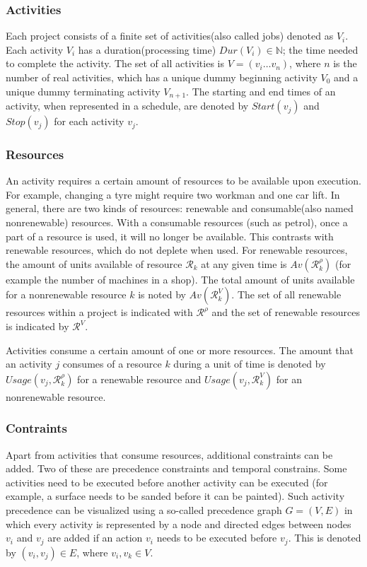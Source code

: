 \documentclass{article}
\begin{document}
\subsubsection{Activities}
Each project consists of a finite set of activities(also called jobs) denoted as $V_i$. Each activity $V_i$ has a duration(processing time) $Dur(V_i) \in \mathbb{N}$; the time needed to complete the activity. The set of all activities is $V = (v_i \ldots v_n)$, where $n$ is the number of real activities, which has a unique dummy beginning activity $V_0$ and a unique dummy terminating activity $V_{n+1}$. The starting and end times of an activity, when represented in a schedule, are denoted by $Start(v_j)$ and $Stop(v_j)$ for each activity $v_j$.

\subsubsection{Resources}
An activity requires a certain amount of resources to be available upon execution. For example, changing a tyre might require two workman and one car lift. In general, there are two kinds of resources: renewable and consumable(also named nonrenewable) resources. With a consumable resources (such as petrol), once a part of a resource is used, it will no longer be available. This contrasts with renewable resources, which do not deplete when used. For renewable resources, the amount of units available of resource $\mathcal{R}_k$ at any given time is $Av(\mathcal{R}^{\rho}_k)$ (for example the number of machines in a shop). The total amount of units available for a nonrenewable resource $k$ is noted by $Av(\mathcal{R}^{V}_k)$. The set of all renewable resources within a project is indicated with $\mathcal{R}^{\rho}$ and the set of renewable resources is indicated by $\mathcal{R}^{V}$. 

Activities consume a certain amount of one or more resources. The amount that an activity $j$ consumes of a resource $k$ during a unit of time is denoted by $Usage(v_j, \mathcal{R}^{\rho}_k)$ for a renewable resource and   $Usage(v_j, \mathcal{R}^V_k)$ for an nonrenewable resource. 

\subsubsection{Contraints}
Apart from activities that consume resources, additional constraints can be added. Two of these are precedence constraints and temporal constrains. Some activities need to be executed before another activity can be executed (for example, a surface needs to be sanded before it can be painted). Such activity precedence can be visualized using a so-called precedence graph $G = (V, E)$ in which every activity is represented by a node and directed edges between nodes $v_i$ and $v_j$ are added if an action $v_i$ needs to be executed before $v_j$. This is denoted by $(v_i,v_j) \in E$, where $v_i, v_k \in V$.
\end{document}
